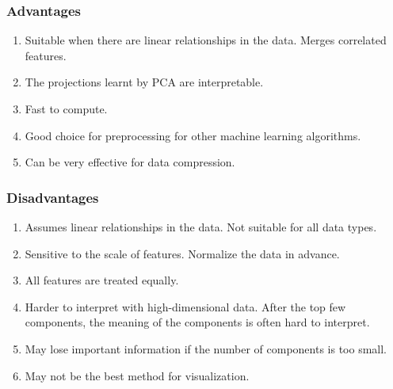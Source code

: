 \documentclass[11pt]{article}
\begin{document}
\subsubsection{Advantages}
\begin{enumerate}
    \item Suitable when there are linear relationships in the data. Merges correlated features.
    \item The projections learnt by PCA are interpretable.
    \item Fast to compute.
    \item Good choice for preprocessing for other machine learning algorithms.
    \item Can be very effective for data compression.
\end{enumerate}
\subsubsection{Disadvantages}
\begin{enumerate}
    \item Assumes linear relationships in the data. Not suitable for all data types.
    \item Sensitive to the scale of features. Normalize the data in advance.
    \item All features are treated equally.
    \item Harder to interpret with high-dimensional data. After the top few components, the meaning of the components is often hard to interpret.
    \item May lose important information if the number of components is too small.
    \item May not be the best method for visualization.
\end{enumerate}
\end{document}
